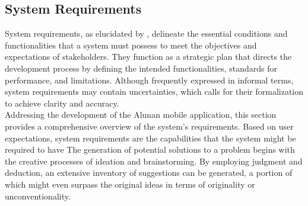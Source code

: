 \subsection{System Requirements}
System requirements, as elucidated by \textcite{mokos20}, delineate the essential conditions and functionalities that a system must possess to meet the objectives and expectations of stakeholders. They function as a strategic plan that directs the development process by defining the intended functionalities, standards for performance, and limitations. Although frequently expressed in informal terms, system requirements may contain uncertainties, which calls for their formalization to achieve clarity and accuracy. \\

Addressing the development of the Alunan mobile application, this section provides a comprehensive overview of the system's requirements. Based on user expectations, system requirements are the capabilities that the system might be required to have The generation of potential solutions to a problem begins with the creative processes of ideation and brainstorming. By employing judgment and deduction, an extensive inventory of suggestions can be generated, a portion of which might even surpass the original ideas in terms of originality or unconventionality.

